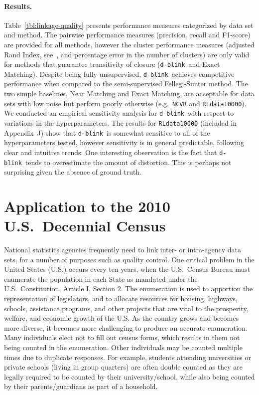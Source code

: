 \documentclass[12pt,letterpaper]{article}
\newcommand{\1}[1]{\mathbb{I}\!\left[#1\right]} %
\newcommand{\dblink}{\texttt{\upshape \lowercase{d-blink}}} %
\begin{document}
\paragraph{Results.}
Table~\ref{tbl:linkage-quality} presents performance measures categorized 
by data set and method.
The pairwise performance measures (precision, recall and F1-score) are 
provided for all methods, however the cluster performance measures 
(adjusted Rand Index, see~\citealp{vinh_information_2010}, and percentage 
error in the number of clusters) are only valid for methods that guarantee 
transitivity of closure (\dblink\ and Exact Matching). 
Despite being fully unsupervised, \dblink\ achieves competitive performance 
when compared to the semi-supervised Fellegi-Sunter method.
The two simple baselines, Near Matching and Exact Matching, are acceptable 
for data sets with low noise but perform poorly otherwise (e.g.\ \texttt{NCVR} 
and \texttt{RLdata10000}).
We conducted an empirical sensitivity analysis for \dblink\ with respect to 
variations in the hyperparameters.
The results for \texttt{RLdata10000} (included in Appendix~J) show that 
\dblink\ is somewhat sensitive to all of the hyperparameters tested, 
however sensitivity is in general predictable, following clear and 
intuitive trends.
One interesting observation is the fact that \dblink\ tends to overestimate 
the amount of distortion.
This is perhaps not surprising given the absence of ground truth.

\section{Application to the 2010 U.S.\ Decennial Census}
\label{sec:decennial}
National statistics agencies frequently need to link inter- or intra-agency 
data sets, for a number of purposes such as quality control. 
One critical problem in the United States (U.S.) occurs every ten years, when 
the U.S.\ Census Bureau must enumerate the population in each State as 
mandated under the U.S.\ Constitution, Article I, Section 2. 
The enumeration is used to apportion the representation of legislators, 
and to allocate resources for housing, highways, schools, assistance 
programs, and other projects that are vital to the prosperity, welfare, 
and economic growth of the U.S. 
As the country grows and becomes more diverse, it becomes more challenging 
to produce an accurate enumeration. 
Many individuals elect not to fill out census forms, which results in 
them not being counted in the enumeration. 
Other individuals may be counted multiple times due to duplicate responses. 
For example, students attending universities or private schools (living 
in group quarters) are often double counted as they are legally required 
to be counted by their university\slash school, while also being counted 
by their parents\slash guardians as part of a household. 
\end{document}
